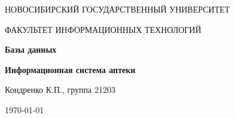 \begin{center}
	{\LARGE \textsc{НОВОСИБИРСКИЙ ГОСУДАРСТВЕННЫЙ УНИВЕРСИТЕТ}\par}
	{\textsc{ФАКУЛЬТЕТ ИНФОРМАЦИОННЫХ ТЕХНОЛОГИЙ}\par}
	
	\vspace{3cm}
	
	{\huge\bfseries Базы данных\par}
	
	\vspace{1cm}
	
	{\Large\bfseries Информационная система аптеки\par}
	
	\vspace{10cm}
	
	\begin{flushright}
		Кондренко К.П., группа 21203
	\end{flushright}
	
	\vfill
	
	{\large \today\par}
\end{center}
